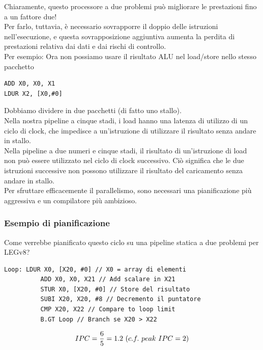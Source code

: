 \documentclass[12pt,a4paper]{article}
\begin{document}
Chiaramente, questo processore a due problemi può migliorare le prestazioni fino a un fattore due!\\
Per farlo, tuttavia, è necessario sovrapporre il doppio delle istruzioni nell'esecuzione, e questa sovrapposizione aggiuntiva aumenta la perdita di prestazioni relativa dai dati e dai rischi di controllo.\\
Per esempio: Ora non possiamo usare il risultato ALU nel load/store nello stesso pacchetto 
\begin{center}
\begin{minipage}{.2\linewidth}
\begin{verbatim}
ADD X0, X0, X1
LDUR X2, [X0,#0]
\end{verbatim}
\end{minipage}
\end{center}
Dobbiamo dividere in due pacchetti (di fatto uno stallo).\\
Nella nostra pipeline a cinque stadi, i load hanno una latenza di utilizzo di un ciclo di clock, che impedisce a un'istruzione di utilizzare il risultato senza andare in stallo.\\
Nella pipeline a due numeri e cinque stadi, il risultato di un'istruzione di load non può essere utilizzato nel ciclo di clock successivo. Ciò significa che le due istruzioni successive non possono utilizzare il risultato del caricamento senza andare in stallo.\\
Per sfruttare efficacemente il parallelismo, sono necessari una pianificazione più aggressiva e un compilatore più ambizioso.
\subsubsection{Esempio di pianificazione}
Come verrebbe pianificato questo ciclo su una pipeline statica a due problemi per LEGv8?
\begin{verbatim}
Loop: LDUR X0, [X20, #0] // X0 = array di elementi
          ADD X0, X0, X21 // Add scalare in X21
          STUR X0, [X20, #0] // Store del risultato
          SUBI X20, X20, #8 // Decremento il puntatore
          CMP X20, X22 // Compare to loop limit
          B.GT Loop // Branch se X20 > X22
\end{verbatim}
\begin{center}
\end{center}
$$IPC = {6\over5} = 1.2\ (c.f.\ peak\ IPC =2)$$
\end{document}
